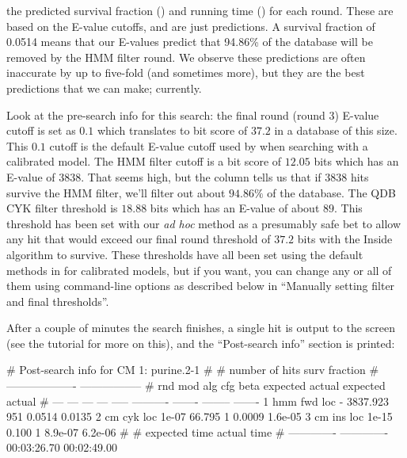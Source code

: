\begin{wideitem}
\item[\emprog{predictions}] the predicted survival fraction
  () and running time () for each
  round. These are based on the E-value cutoffs, and are just
  predictions. A survival fraction of 0.0514 means that our E-values
  predict that 94.86\% of the database will be removed by the HMM
  filter round. We observe these predictions are often inaccurate by up
  to five-fold (and sometimes more), but they are the best predictions
  that we can make; currently.
\end{wideitem}

Look at the pre-search info for this search: the final round (round 3)
E-value cutoff is set as $0.1$ which translates to bit score of $37.2$
in a database of this size. This $0.1$ cutoff is the
default E-value cutoff used by  when searching with a
calibrated model. The HMM filter cutoff is a bit score of $12.05$ bits
which has an E-value of $3838$.  That seems high, but the 
column tells us that if $3838$ hits survive the HMM filter, we'll
filter out about $94.86\%$ of the database. The QDB CYK filter
threshold is $18.88$ bits which has an E-value of about $89$. This
threshold has been set with our \emph{ad hoc} method as a presumably
safe bet to allow any hit that would exceed our final round threshold
of $37.2$ bits with the Inside algorithm to survive. These thresholds
have all been set using the default methods in  for
calibrated models, but if you want, you can change any or all of them
using command-line options as described below in ``Manually setting
filter and final thresholds''.

After a couple of minutes the search finishes, a single hit is output
to the screen (see the tutorial for more on this), and the
``Post-search info'' section is printed:

\begin{sreoutput}
# Post-search info for CM 1: purine.2-1
#
#                              number of hits       surv fraction  
#                            -------------------  -----------------
# rnd  mod  alg  cfg   beta    expected   actual  expected   actual
# ---  ---  ---  ---  -----  ----------  -------  --------  -------
    1  hmm  fwd  loc      -    3837.923      951    0.0514   0.0135
    2   cm  cyk  loc  1e-07      66.795        1    0.0009  1.6e-05
    3   cm  ins  loc  1e-15       0.100        1   8.9e-07  6.2e-06
#
# expected time    actual time
# -------------  -------------
    00:03:26.70    00:02:49.00
\end{sreoutput}

